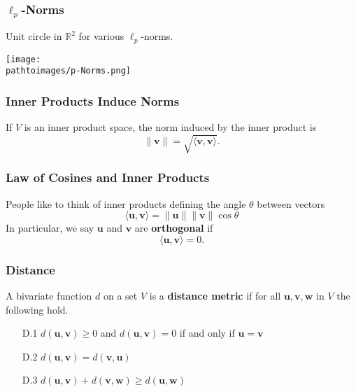 \documentclass{beamer}
\newcommand{\pathtoimages}{/Users/charlesrambo/Desktop/Bootcamp24/Images}
\begin{document}
\begin{frame}
\frametitle{$\boldsymbol \ell_p$-Norms}
Unit circle in $\mathbb{R}^2$ for various $\ell_p$-norms.
\begin{center}
\texttt{[image: \\pathtoimages/p-Norms.png]}
\end{center}

\end{frame}

\begin{frame}
\frametitle{Inner Products Induce Norms}
If $V$ is an inner product space, the norm induced by the inner product is
$$
\| {\boldsymbol v}\| = \sqrt{\langle {\boldsymbol v}, {\boldsymbol v} \rangle}.
$$
\end{frame}

\begin{frame}[t]
\frametitle{Law of Cosines and Inner Products}
People like to think of inner products defining the angle $\theta$ between vectors
$$
\langle {\boldsymbol u}, {\boldsymbol v}\rangle = \| {\boldsymbol u}\| \|{\boldsymbol v}\|\cos\theta
$$
In particular, we say ${\boldsymbol u}$ and ${\boldsymbol v}$ are {\bf orthogonal} if
$$
\langle {\boldsymbol u}, {\boldsymbol v}\rangle = 0.
$$
\end{frame}


\begin{frame}
\frametitle{Distance}
\begin{Definition}
A bivariate function $d$ on a set $V$ is a {\bf distance metric} if for all ${\boldsymbol u}, {\boldsymbol v}, {\boldsymbol w}$ in $V$ the following hold.
\begin{enumerate}
\item[D.1] $d({\boldsymbol u}, {\boldsymbol v}) \geq 0$ and $d({\boldsymbol u}, {\boldsymbol v}) = 0$ if and only if ${\boldsymbol u} = {\boldsymbol v}$
\item[D.2] $d({\boldsymbol u}, {\boldsymbol v}) = d({\boldsymbol v}, {\boldsymbol u})$
\item[D.3]  $d({\boldsymbol u}, {\boldsymbol v}) + d({\boldsymbol v}, {\boldsymbol w}) \geq d({\boldsymbol u}, {\boldsymbol w})$
\end{enumerate}
\end{Definition}
\end{frame}
\end{document}
